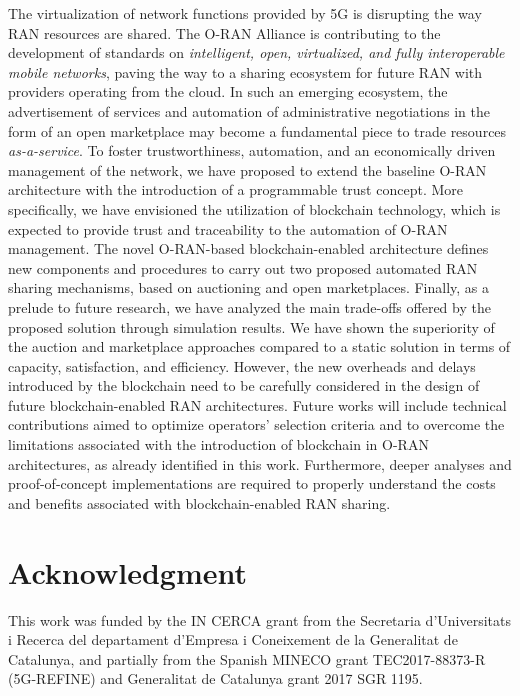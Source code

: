 \documentclass[journal]{IEEEtran}
\begin{document}
	The virtualization of network functions provided by 5G is disrupting the way RAN resources are shared. The O-RAN Alliance is contributing to the development of standards on \textit{intelligent, open, virtualized, and fully interoperable mobile networks}, paving the way to a sharing ecosystem for future RAN with providers operating from the cloud. In such an emerging ecosystem, the advertisement of services and automation of administrative negotiations in the form of an open marketplace may become a fundamental piece to trade resources \textit{as-a-service}. To foster trustworthiness, automation, and an economically driven management of the network, we have proposed to extend the baseline O-RAN architecture with the introduction of a programmable trust concept. More specifically, we have envisioned the utilization of blockchain technology, which is expected to provide trust and traceability to the automation of O-RAN management. The novel O-RAN-based blockchain-enabled architecture defines new components and procedures to carry out two proposed automated RAN sharing mechanisms, based on auctioning and open marketplaces. Finally, as a prelude to future research, we have analyzed the main trade-offs offered by the proposed solution through simulation results. We have shown the superiority of the auction and marketplace approaches compared to a static solution in terms of capacity, satisfaction, and efficiency. However, the new overheads and delays introduced by the blockchain need to be carefully considered in the design of future blockchain-enabled RAN architectures. Future works will include technical contributions aimed to optimize operators' selection criteria and to overcome the limitations associated with the introduction of blockchain in O-RAN architectures, as already identified in this work. Furthermore, deeper analyses and proof-of-concept implementations are required to properly understand the costs and benefits associated with blockchain-enabled RAN sharing.
	
	\section*{Acknowledgment}
	This work was funded by the IN CERCA grant from the Secretaria d'Universitats i Recerca del departament d'Empresa i Coneixement de la Generalitat de Catalunya, and partially from the Spanish MINECO grant TEC2017-88373-R (5G-REFINE) and Generalitat de Catalunya grant 2017 SGR 1195.
	
	\ifCLASSOPTIONcaptionsoff
	\newpage
	\fi
	
\end{document}
